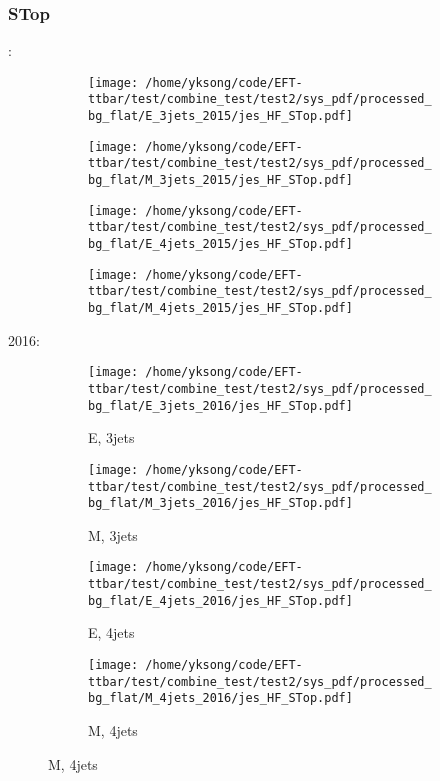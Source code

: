 \documentclass{beamer}
\begin{document}
\begin{frame}
\frametitle{STop}
\fontsize{5}{1}:
\begin{figure}
\centering
\begin{subfigure}[b]{0.24\textwidth}
\texttt{[image: /home/yksong/code/EFT-ttbar/test/combine\_test/test2/sys\_pdf/processed\_bg\_flat/E\_3jets\_2015/jes\_HF\_STop.pdf]}
\end{subfigure}
\begin{subfigure}[b]{0.24\textwidth}
\texttt{[image: /home/yksong/code/EFT-ttbar/test/combine\_test/test2/sys\_pdf/processed\_bg\_flat/M\_3jets\_2015/jes\_HF\_STop.pdf]}
\end{subfigure}
\begin{subfigure}[b]{0.24\textwidth}
\texttt{[image: /home/yksong/code/EFT-ttbar/test/combine\_test/test2/sys\_pdf/processed\_bg\_flat/E\_4jets\_2015/jes\_HF\_STop.pdf]}
\end{subfigure}
\begin{subfigure}[b]{0.24\textwidth}
\texttt{[image: /home/yksong/code/EFT-ttbar/test/combine\_test/test2/sys\_pdf/processed\_bg\_flat/M\_4jets\_2015/jes\_HF\_STop.pdf]}
\end{subfigure}
\end{figure}
2016:
\begin{figure}
\centering
\begin{subfigure}[b]{0.24\textwidth}
\texttt{[image: /home/yksong/code/EFT-ttbar/test/combine\_test/test2/sys\_pdf/processed\_bg\_flat/E\_3jets\_2016/jes\_HF\_STop.pdf]}
\captionsetup{font=tiny}
\caption{E, 3jets}
\end{subfigure}
\begin{subfigure}[b]{0.24\textwidth}
\texttt{[image: /home/yksong/code/EFT-ttbar/test/combine\_test/test2/sys\_pdf/processed\_bg\_flat/M\_3jets\_2016/jes\_HF\_STop.pdf]}
\captionsetup{font=tiny}
\caption{M, 3jets}
\end{subfigure}
\begin{subfigure}[b]{0.24\textwidth}
\texttt{[image: /home/yksong/code/EFT-ttbar/test/combine\_test/test2/sys\_pdf/processed\_bg\_flat/E\_4jets\_2016/jes\_HF\_STop.pdf]}
\captionsetup{font=tiny}
\caption{E, 4jets}
\end{subfigure}
\begin{subfigure}[b]{0.24\textwidth}
\texttt{[image: /home/yksong/code/EFT-ttbar/test/combine\_test/test2/sys\_pdf/processed\_bg\_flat/M\_4jets\_2016/jes\_HF\_STop.pdf]}
\captionsetup{font=tiny}
\caption{M, 4jets}
\end{subfigure}
\end{figure}
\end{frame}
\end{document}
